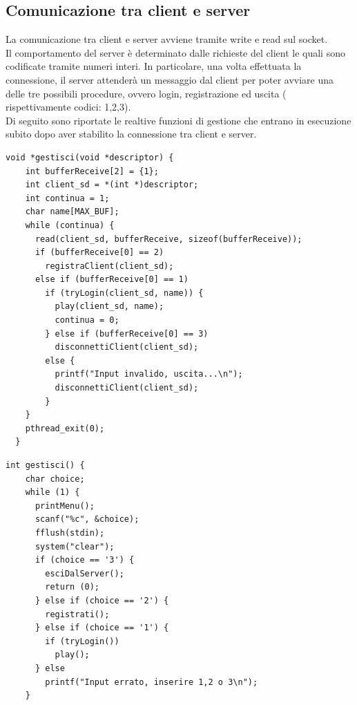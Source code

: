 \documentclass[a4paper]{article}
\begin{document}
\subsection{Comunicazione tra client e server}
La comunicazione tra client e server avviene tramite write e read sul socket.\\
Il comportamento del server è determinato dalle richieste del client le quali sono codificate tramite numeri interi. In particolare, una volta effettuata la connessione,
il server attenderà un messaggio dal client per poter avviare una delle tre possibili procedure, ovvero login, registrazione ed uscita ( rispettivamente codici: 1,2,3).\\
Di seguito sono riportate le realtive funzioni di gestione che entrano in esecuzione subito dopo aver stabilito la connessione
tra client e server.
\begin{lstlisting}[caption=Thread di gestione del server]
  void *gestisci(void *descriptor) {
    int bufferReceive[2] = {1};
    int client_sd = *(int *)descriptor;
    int continua = 1;
    char name[MAX_BUF];
    while (continua) {
      read(client_sd, bufferReceive, sizeof(bufferReceive));
      if (bufferReceive[0] == 2)
        registraClient(client_sd);
      else if (bufferReceive[0] == 1)
        if (tryLogin(client_sd, name)) {
          play(client_sd, name);
          continua = 0;
        } else if (bufferReceive[0] == 3)
          disconnettiClient(client_sd);
        else {
          printf("Input invalido, uscita...\n");
          disconnettiClient(client_sd);
        }
    }
    pthread_exit(0);
  }
\end{lstlisting}
\begin{lstlisting}[caption=Procedura di gestione del client]
  int gestisci() {
    char choice;
    while (1) {
      printMenu();
      scanf("%c", &choice);
      fflush(stdin);
      system("clear");
      if (choice == '3') {
        esciDalServer();
        return (0);
      } else if (choice == '2') {
        registrati();
      } else if (choice == '1') {
        if (tryLogin())
          play();
      } else
        printf("Input errato, inserire 1,2 o 3\n");
    }
\end{lstlisting}
\lstlistoflistings
\end{document}
